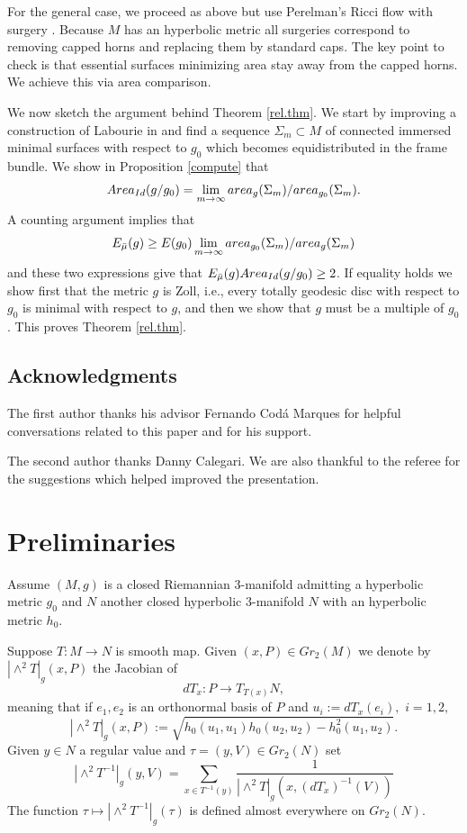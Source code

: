 \documentclass[11pt]{amsart}
\theoremstyle{remark}
\theoremstyle{definition}
\begin{document}
{{	For the general  case, we proceed as above but use Perelman's Ricci flow with surgery \cite{perelman}. Because $M$ has an hyperbolic metric all surgeries correspond to removing capped horns and replacing them by standard caps. The key point to check is that essential  surfaces minimizing area stay away from the capped horns. We achieve this via area comparison.
	
	We now sketch the argument behind Theorem \ref{rel.thm}. We start by improving a construction of Labourie in \cite{Labourie} and find  a sequence $\Sigma_m\subset M$ of connected immersed minimal surfaces with respect to $g_0$ which becomes equidistributed in the frame bundle.
	We show in Proposition \ref{compute}  that $${\rm Area}_{{\rm Id}}(g/g_0)=\lim_{m\to\infty}{\rm area}_g(\Sigma_m)/{\rm area}_{g_0}(\Sigma_m).$$
	A counting argument implies that $$E_{\bar\mu}(g)\geq E(g_0)\lim_{m\to\infty}{\rm area}_{g_0}(\Sigma_m)/{\rm area}_{g}(\Sigma_m)$$
	and these two expressions give that $E_{\bar\mu}(g){\rm Area}_{{\rm Id}}(g/g_0)\geq 2$. If equality holds we show first that the metric $g$ is Zoll, i.e., every totally geodesic disc with respect to $g_0$ is minimal with respect to $g$, and then we show that  $g$ must be a multiple of $g_0$. This proves Theorem \ref{rel.thm}.
	
	
	
	
	\subsection{Acknowledgments} 
	
	The first author thanks his advisor Fernando Cod\'a Marques for helpful conversations related to this paper and for his support. 
	
	The second author thanks Danny Calegari. We are also thankful to the referee for the suggestions which helped improved the presentation. 
	
	
	
	
	\section{Preliminaries}\label{prelim}
	
	
	
	
	
	Assume $(M,g)$ is a closed Riemannian $3$-manifold admitting a hyperbolic metric $g_0$ and $N$  another closed hyperbolic $3$-manifold  $N$ with an hyperbolic metric $h_0$. 
	
	
	Suppose $T:M\rightarrow N$ is  smooth map. {Given $(x,P)\in Gr_2(M)$ we denote by $|\wedge^2T|_g(x,P)$ the Jacobian of  $$dT_x:P\rightarrow T_{T(x)}{N},$$ meaning that if $e_1,e_2$ is an orthonormal basis of $P$  and $u_i:=dT_x(e_i),$ $i=1,2,$
		$$|\wedge^2T|_g(x,P):=\sqrt{h_0(u_1,u_1)h_0(u_2,u_2)-h_0^2(u_1,u_2)}.$$}
	Given $y\in N$ a regular value {and $\tau=(y,V)\in  Gr_2(N)$ set
		$$|\wedge^2T^{-1}|_g(y,V)=\sum_{x\in T^{-1}(y)}\frac{1}{|\wedge^2T|_g(x,(dT_x)^{-1}(V))}$$
		The function $\tau\mapsto|\wedge^2T^{-1}|_g(\tau)$} is defined almost everywhere on $Gr_2(N)$.
	
}}
\end{document}
